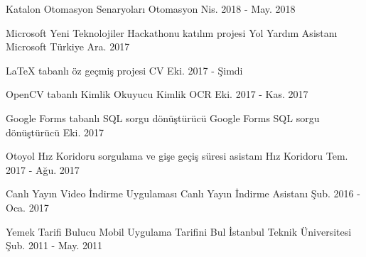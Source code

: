 \begin{cventries}
  \cventry
    {Katalon Otomasyon Senaryoları} %
    {Otomasyon} %
    {} %
    {Nis. 2018 - May. 2018} %
    {}

  \cventry
    {Microsoft Yeni Teknolojiler Hackathonu katılım projesi} %
    {Yol Yardım Asistanı} %
    {Microsoft Türkiye} %
    {Ara. 2017} %
    {}

  \cventry
    {LaTeX tabanlı öz geçmiş projesi} %
    {CV} %
    {} %
    {Eki. 2017 - Şimdi} %
    {}

  \cventry
    {OpenCV tabanlı Kimlik Okuyucu} %
    {Kimlik OCR} %
    {} %
    {Eki. 2017 - Kas. 2017} %
    {}

  \cventry
    {Google Forms tabanlı SQL sorgu dönüştürücü} %
    {Google Forms SQL sorgu dönüştürücü} %
    {} %
    {Eki. 2017} %
    {}

  \cventry
    {Otoyol Hız Koridoru sorgulama ve gişe geçiş süresi asistanı} %
    {Hız Koridoru} %
    {} %
    {Tem. 2017 - Ağu. 2017} %
    {}

  \cventry
    {Canlı Yayın Video İndirme Uygulaması} %
    {Canlı Yayın İndirme Asistanı} %
    {} %
    {Şub. 2016 - Oca. 2017} %
    {}

  \cventry
    {Yemek Tarifi Bulucu Mobil Uygulama} %
    {Tarifini Bul} %
    {İstanbul Teknik Üniversitesi} %
    {Şub. 2011 - May. 2011} %
    {}

\end{cventries}
